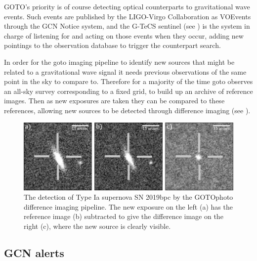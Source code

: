 \begin{colsection}
\begin{colsection}
GOTO's priority is of course detecting optical counterparts to gravitational wave events. Such events are published by the LIGO-Virgo Collaboration as VOEvents through the GCN Notice system, and the G-TeCS sentinel (see ) is the system in charge of listening for and acting on those events when they occur, adding new pointings to the observation database to trigger the counterpart search.

In order for the \gls{goto} imaging pipeline to identify new sources that might be related to a gravitational wave signal it needs previous observations of the same point in the sky to compare to. Therefore for a majority of the time \gls{goto} observes an all-sky survey corresponding to a fixed grid, to build up an archive of reference images. Then as new exposures are taken they can be compared to these references, allowing new sources to be detected through difference imaging (see ).

\begin{figure}[t]
    \begin{center}
        \includegraphics[width=\linewidth]{images/diffimg.pdf}
    \end{center}
    \caption[The detection of SN 2019bpc through difference imaging]{
        The detection of Type Ia supernova SN 2019bpc by the GOTOphoto difference imaging pipeline. The new exposure on the left (a) has the reference image (b) subtracted to give the difference image on the right (c), where the new source is clearly visible.
    }\label{fig:difference_imaging}
\end{figure}

\end{colsection}


\subsection{GCN alerts}
\label{sec:gcn}
\begin{colsection}


\end{colsection}
\end{colsection}
